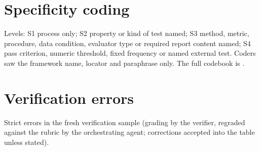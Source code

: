 \documentclass[conference]{IEEEtran}
\begin{document}
\section{Specificity coding}\label{app:spec}
Levels: S1 process only; S2 property or kind of test named; S3 method, metric, procedure, data condition, evaluator type or required report content named; S4 pass criterion, numeric threshold, fixed frequency or named external test. Coders saw the framework name, locator and paraphrase only. The full codebook is .

\begin{table}[h]\centering\small
{}
\caption{Specificity levels (counts) by binding status for the two blind coders.}
\end{table}

\section{Verification errors}\label{app:errors}
Strict errors in the fresh verification sample (grading by the verifier, regraded against the rubric by the orchestrating agent; corrections accepted into the table unless stated).

\end{document}
